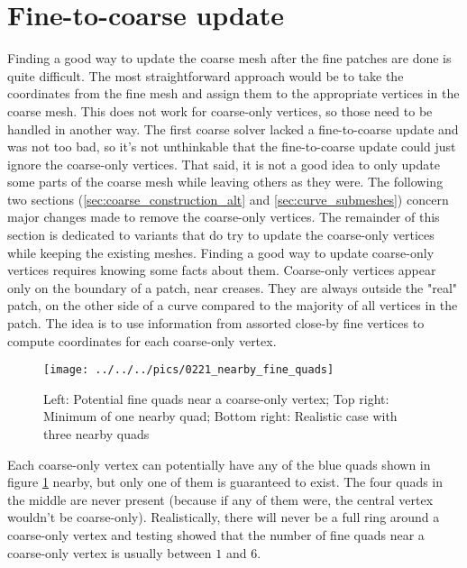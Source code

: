 \documentclass[a4paper,twoside,12pt,nochapterprefix]{scrbook}
\begin{document}
\section{Fine-to-coarse update}\label{ftc_update}
Finding a good way to update the coarse mesh after the fine patches are done is quite difficult. The most straightforward approach would be to take the coordinates from the fine mesh and assign them to the appropriate vertices in the coarse mesh. This does not work for coarse-only vertices, so those need to be handled in another way.\newline
The first coarse solver lacked a fine-to-coarse update and was not too bad, so it's not unthinkable that the fine-to-coarse update could just ignore the coarse-only vertices. That said, it is not a good idea to only update some parts of the coarse mesh while leaving others as they were.\newline
The following two sections (\ref{sec:coarse_construction_alt} and \ref{sec:curve_submeshes}) concern major changes made to remove the coarse-only vertices. The remainder of this section is dedicated to variants that do try to update the coarse-only vertices while keeping the existing meshes.\newline%
Finding a good way to update coarse-only vertices requires knowing some facts about them. Coarse-only vertices appear only on the boundary of a patch, near creases. They are always outside the "real" patch, on the other side of a curve compared to the majority of all vertices in the patch. The idea is to use information from assorted close-by fine vertices to compute coordinates for each coarse-only vertex.\newline
\begin{figure}
    \centering
    \texttt{[image: ../../../pics/0221\_nearby\_fine\_quads]}
    \caption{Left: Potential fine quads near a coarse-only vertex; Top right: Minimum of one nearby quad; Bottom right: Realistic case with three nearby quads
      \label{fig:coarseonly_neighbourhood}}
\end{figure}
Each coarse-only vertex can potentially have any of the blue quads shown in figure \ref{fig:coarseonly_neighbourhood} nearby, but only one of them is guaranteed to exist. The four quads in the middle are never present (because if any of them were, the central vertex wouldn't be coarse-only). Realistically, there will never be a full ring around a coarse-only vertex and testing showed that the number of fine quads near a coarse-only vertex is usually between $1$ and $6$.\newline
\end{document}
